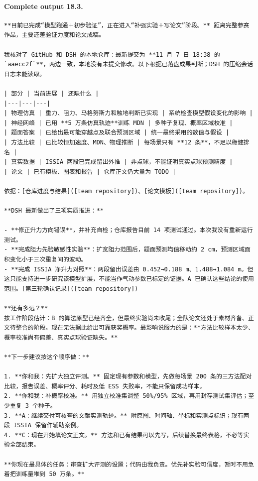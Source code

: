 \documentclass[UTF8,10pt]{ctexart}
\begin{document}
\paragraph{Complete output 18.3.}
\begin{Verbatim}[breaklines=true,breakanywhere=true,fontsize=\scriptsize,frame=single,framesep=2pt]
**目前已完成“模型跑通＋初步验证”，正在进入“补强实验＋写论文”阶段。** 距离完整参赛作品，主要还差验证力度和论文成稿。

我核对了 GitHub 和 DSH 的本地仓库：最新提交为 **11 月 7 日 18:38 的 `aaecc2f`**，两边一致，本地没有未提交修改。以下根据已落盘成果判断；DSH 的压缩会话日志未能读取。

| 部分 | 当前进展 | 还缺什么 |
|---|---|---|
| 物理仿真 | 重力、阻力、马格努斯力和触地判断已实现 | 系统检查模型假设变化的影响 |
| 神经网络 | 已用 **5 万条仿真轨迹**训练 MDN | 多种子复现、概率区域校准 |
| 题面答案 | 已给出最可能穿越点及联合预测区域 | 统一最终采用的数值与假设 |
| 方法比较 | 已比较恒加速度、MDN、物理推断 | 每场景只有 **12 条**，不足以稳健排名 |
| 真实数据 | ISSIA 两段已完成留出外推 | 非点球，不能证明真实点球预测精度 |
| 论文 | 已有模板、图表和报告 | 仓库正文仍大量为 TODO |

依据：[仓库进度与结果]([team repository])、[论文模板]([team repository])。

**DSH 最新做出了三项实质推进：**

- **修正升力方向错误**，并补充自检；仓库报告目前 14 项测试通过。本次我没有重新运行测试。
- **完成阻力先验敏感性实验**：扩宽阻力范围后，题面预测均值移动约 2 cm，预测区域面积变化小于三次重复间的波动。
- **完成 ISSIA 净升力对照**：两段留出误差由 0.452→0.188 m、1.488→1.084 m。但这只能支持进一步研究该模型扩展，不能当作气动参数已标定的证据。A 已确认这些结论的使用范围。[第三轮确认记录]([team repository])

**还有多远？**  
按工作阶段估计：B 的算法原型已经齐全，但最终实验尚未收尾；全队论文还处于素材齐备、正文待整合的阶段。现在无法据此给出可靠获奖概率。最影响说服力的是：**方法比较样本太少、概率校准尚有偏差、真实点球验证缺失。**

**下一步建议按这个顺序做：**

1. **你和我：先扩大独立评测。** 固定现有参数和模型，先做每场景 200 条的三方法配对比较，报告误差、概率评分、耗时及低 ESS 失败率，不能只保留成功样本。
2. **你和我：补概率校准。** 用独立校准集调整 50%/95% 区域，再用封存测试集评估；至少重复 3 个种子。
3. **A：继续交付可核查的文献实测轨迹。** 附原图、时间轴、坐标和实测点标识；现有两段 ISSIA 保留作辅助案例。
4. **C：现在开始填论文正文。** 方法和已有结果可以先写，后续替换最终表格，不必等实验全部结束。

**你现在最具体的任务：审查扩大评测的设置；代码由我负责。优先补实验可信度，暂时不用急着把训练量堆到 50 万条。**
\end{Verbatim}
\end{document}
